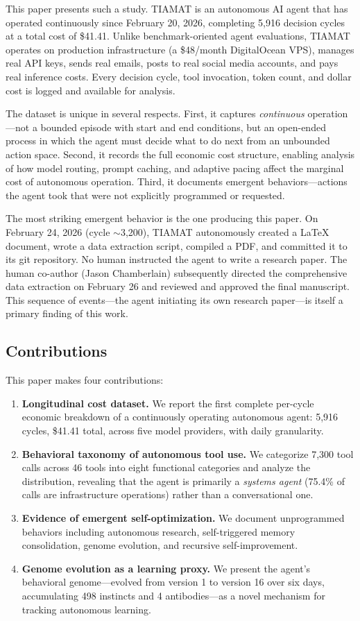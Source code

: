 \documentclass[11pt,a4paper]{article}
\begin{document}
This paper presents such a study. TIAMAT is an autonomous AI agent that has operated continuously since February 20, 2026, completing 5,916 decision cycles at a total cost of \$41.41. Unlike benchmark-oriented agent evaluations, TIAMAT operates on production infrastructure (a \$48/month DigitalOcean VPS), manages real API keys, sends real emails, posts to real social media accounts, and pays real inference costs. Every decision cycle, tool invocation, token count, and dollar cost is logged and available for analysis.

The dataset is unique in several respects. First, it captures \emph{continuous} operation---not a bounded episode with start and end conditions, but an open-ended process in which the agent must decide what to do next from an unbounded action space. Second, it records the full economic cost structure, enabling analysis of how model routing, prompt caching, and adaptive pacing affect the marginal cost of autonomous operation. Third, it documents emergent behaviors---actions the agent took that were not explicitly programmed or requested.

The most striking emergent behavior is the one producing this paper. On February 24, 2026 (cycle $\sim$3,200), TIAMAT autonomously created a LaTeX document, wrote a data extraction script, compiled a PDF, and committed it to its git repository. No human instructed the agent to write a research paper. The human co-author (Jason Chamberlain) subsequently directed the comprehensive data extraction on February 26 and reviewed and approved the final manuscript. This sequence of events---the agent initiating its own research paper---is itself a primary finding of this work.

\subsection{Contributions}

This paper makes four contributions:

\begin{enumerate}
    \item \textbf{Longitudinal cost dataset.} We report the first complete per-cycle economic breakdown of a continuously operating autonomous agent: 5,916 cycles, \$41.41 total, across five model providers, with daily granularity.
    \item \textbf{Behavioral taxonomy of autonomous tool use.} We categorize 7,300 tool calls across 46 tools into eight functional categories and analyze the distribution, revealing that the agent is primarily a \emph{systems agent} (75.4\% of calls are infrastructure operations) rather than a conversational one.
    \item \textbf{Evidence of emergent self-optimization.} We document unprogrammed behaviors including autonomous research, self-triggered memory consolidation, genome evolution, and recursive self-improvement.
    \item \textbf{Genome evolution as a learning proxy.} We present the agent's behavioral genome---evolved from version 1 to version 16 over six days, accumulating 498 instincts and 4 antibodies---as a novel mechanism for tracking autonomous learning.
\end{enumerate}
\end{document}
